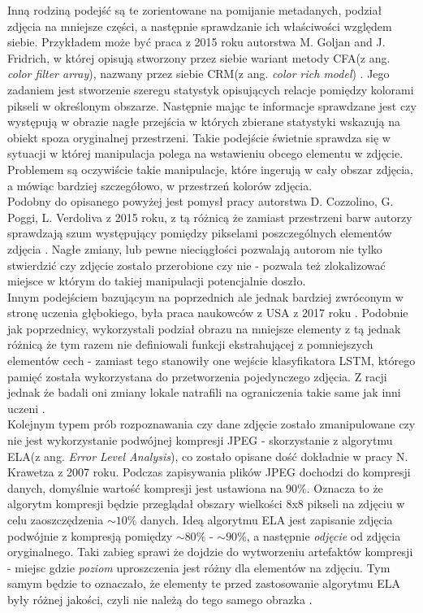 Inną rodziną podejść są te zorientowane na pomijanie metadanych, podział zdjęcia na mniejsze części, a następnie sprawdzanie ich właściwości względem siebie. Przykładem może być praca z 2015 roku autorstwa  M. Goljan and J. Fridrich, w której opisują stworzony przez siebie wariant metody CFA(z ang. \textit{color filter array}), nazwany przez siebie CRM(z ang. \textit{color rich model}) \cite{goljan}. Jego zadaniem jest stworzenie szeregu statystyk opisujących relacje pomiędzy kolorami pikseli w określonym obszarze. Następnie mając te informacje sprawdzane jest czy występują w obrazie nagłe przejścia w których zbierane statystyki wskazują na obiekt spoza oryginalnej przestrzeni. Takie podejście świetnie sprawdza się w sytuacji w której manipulacja polega na wstawieniu obcego elementu w zdjęcie. Problemem są oczywiście takie manipulacje, które ingerują w cały obszar zdjęcia, a mówiąc bardziej szczegółowo, w przestrzeń kolorów zdjęcia.\\

Podobny do opisanego powyżej jest pomysł pracy autorstwa D. Cozzolino, G. Poggi, L. Verdoliva z 2015 roku, z tą różnicą że zamiast przestrzeni barw autorzy sprawdzają szum występujący pomiędzy pikselami poszczególnych elementów zdjęcia \cite{poggi}. Nagłe zmiany, lub pewne nieciągłości pozwalają autorom nie tylko stwierdzić czy zdjęcie zostało przerobione czy nie - pozwala też zlokalizować miejsce w którym do takiej manipulacji potencjalnie doszło.\\

Innym podejściem bazującym na poprzednich ale jednak bardziej zwróconym w stronę uczenia głębokiego, była praca naukowców z USA z 2017 roku \cite{lstm}. Podobnie jak poprzednicy, wykorzystali podział obrazu na mniejsze elementy z tą jednak różnicą że tym razem nie definiowali funkcji ekstrahującej z pomniejszych elementów cech - zamiast tego stanowiły one wejście klasyfikatora LSTM, którego pamięć została wykorzystana do przetworzenia pojedynczego zdjęcia. Z racji jednak że badali oni zmiany lokale natrafili na ograniczenia takie same jak inni uczeni \cite{goljan} \cite{poggi}.\\

Kolejnym typem prób rozpoznawania czy dane zdjęcie zostało zmanipulowane czy nie jest wykorzystanie podwójnej kompresji JPEG - skorzystanie z algorytmu ELA(z ang. \textit{Error Level Analysis}), co zostało opisane dość dokładnie w pracy N. Krawetza z 2007 roku\cite{hacker}. Podczas zapisywania plików JPEG dochodzi do kompresji danych, domyślnie wartość kompresji jest ustawiona na $90\%$. Oznacza to że algorytm kompresji będzie przeglądał obszary wielkości 8x8 pikseli na zdjęciu w celu zaoszczędzenia $\sim10\%$ danych. Ideą algorytmu ELA jest zapisanie zdjęcia podwójnie z kompresją pomiędzy $\sim80\%$ - $\sim90\%$, a następnie \textit{odjęcie} od zdjęcia oryginalnego. Taki zabieg sprawi że dojdzie do wytworzeniu artefaktów kompresji - miejsc gdzie \textit{poziom} uproszczenia jest różny dla elementów na zdjęciu. Tym samym będzie to oznaczało, że elementy te przed zastosowanie algorytmu ELA były różnej jakości, czyli nie należą do tego samego obrazka \cite{oczko}.\\

